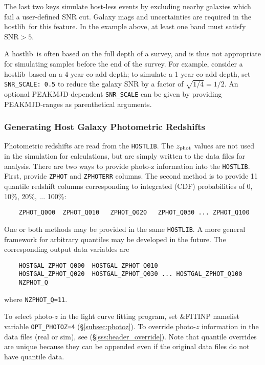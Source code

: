 \documentclass[12pt]{article}
\newcommand{\hostlib}{{\sc hostlib}}
\newcommand{\Zphot}{z_{\rm phot}}
\begin{document}
{The last two keys simulate host-less events by excluding nearby galaxies
which fail a user-defined SNR cut.
Galaxy mags and uncertainties are required in the
\hostlib\ for this feature. 
In the example above, at least one band must satisfy SNR$>5$.

A \hostlib\ is often based on the full depth of a survey,
and is thus not appropriate for simulating samples before
the end of the survey.
For example, consider a \hostlib\ based on a 4-year co-add depth;
to simulate a 1 year co-add depth, set {\tt SNR\_SCALE: 0.5}
to reduce the galaxy SNR by a factor of $\sqrt{1/4}=1/2$.
An optional PEAKMJD-dependent {\tt SNR\_SCALE} can be given
by providing PEAKMJD-ranges as parenthetical arguments.

\subsubsection{Generating Host Galaxy Photometric Redshifts}
\label{sss:quantiles}

Photometric redshifts are read from the {\tt HOSTLIB}.
The $\Zphot$ values are not used in the simulation for calculations,
but are simply written to the data files for analysis.
There are two ways to provide photo-z information into the {\tt HOSTLIB}.
First, provide {\tt ZPHOT} and {\tt ZPHOTERR} columns.
The second method is to provide 11 quantile redshift columns 
corresponding to integrated (CDF) probabilities of 
0, 10\%, 20\%, ... 100\%:
\begin{verbatim}
    ZPHOT_Q000  ZPHOT_Q010   ZPHOT_Q020   ZPHOT_Q030 ... ZPHOT_Q100
\end{verbatim}
One or both methods may be provided in the same {\tt HOSTLIB}.
A more general framework for arbitrary quantiles may be developed in the
future. 
The corresponding output data variables are
\begin{verbatim} 
    HOSTGAL_ZPHOT_Q000  HOSTGAL_ZPHOT_Q010   
    HOSTGAL_ZPHOT_Q020  HOSTGAL_ZPHOT_Q030 ... HOSTGAL_ZPHOT_Q100 
    NZPHOT_Q
\end{verbatim}
%
where {\tt NZPHOT\_Q=11}.

To select photo-$z$ in the light curve fitting program,
set {\&FITINP} namelist variable {\tt OPT\_PHOTOZ=4}
(\S\ref{subsec:photoz}). To override photo-$z$ information
in the data files (real or sim), 
see (\S\ref{sss:header_override}).
Note that quantile overrides are unique because they can
be appended even if the original data files do not have
quantile data.


\clearpage
}
\end{document}
